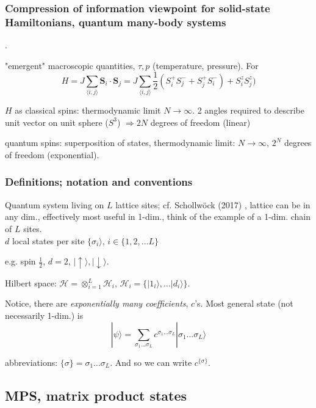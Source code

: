 \documentclass[10pt]{amsart}
\begin{document}
\begin{multicols*}{2}
\subsubsection{Compression of information viewpoint for solid-state Hamiltonians, quantum many-body systems}.

"emergent" macroscopic quantities, $\tau, p$ (temperature, pressure). For 
\[
	H = J \sum_{ \langle i , j \rangle } \mathbf{S}_i \cdot \mathbf{S}_j = J \sum_{ \langle i, j \rangle } \frac{1}{2} (S_i^{+} S_j^- + S_j^{+} S_i^-) + S_i^z S_j^z  )
\]

$H$ as classical spins: thermodynamic limit $N \to \infty$. 2 angles required to describe unit vector on unit sphere ($S^3$) $\Longrightarrow 2N $ degrees of freedom (linear)

quantum spins: superposition of states, thermodynamic limit: $N \to \infty$, $2^N$ degrees of freedom (exponential).

\subsubsection{Definitions; notation and conventions}

Quantum system living on $L$ lattice sites; cf. Schollw\"{o}ck (2017) \cite{ArSo2017}, lattice can be in any dim., effectively most useful in 1-dim., think of the example of a 1-dim. chain of $L$ sites. \\

$d$ local states per site $\lbrace \sigma_i \rangle$, $i \in \lbrace 1,2, \dots L\rbrace$

e.g. spin $\frac{1}{2}$, $d=2$, $| \uparrow \rangle, | \downarrow \rangle$.

Hilbert space: $\mathcal{H} = \otimes_{i=1}^L \mathcal{H}_i$, $\mathcal{H}_i = \lbrace | 1_i \rangle , \dots | d_i \rangle \rbrace$. 

Notice, there are \emph{exponentially many coefficients}, $c$'s. Most general state (not necessarily 1-dim.) is 
\begin{equation}
|\psi \rangle = \sum_{\sigma_1 \dots \sigma_L} c^{\sigma_1 \dots \sigma_L} | \sigma_1 \dots \sigma_L \rangle
\end{equation}

abbreviations: $\lbrace \sigma \rbrace = \sigma_1 \dots \sigma_L$. And so we can write $c^{\lbrace \sigma \rbrace}$. 

\subsection{MPS, matrix product states}


\end{multicols*}
\end{document}
